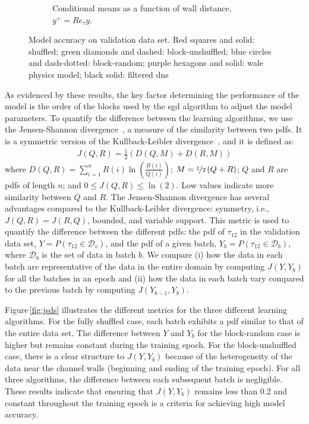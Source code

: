 \documentclass[review]{elsarticle}
\begin{document}
\begin{figure}[!tbp]
\begin{subfigure}[t]{0.48\textwidth}
    \caption{Conditional means as a function of wall distance, $y^+ = Re_\tau y$.}%
  \end{subfigure}%
  \caption{Model accuracy on validation data set. Red squares and solid: shuffled; green diamonds and dashed: block-unshuffled; blue circles and dash-dotted: block-random; purple hexagons and solid: \gls{wale} physics model; black solid: filtered \gls{dns}}\label{fig:predictions}%
\end{figure}%

As evidenced by these results, the key factor determining the
performance of the model is the order of the blocks used by the
\gls{sgd} algorithm to adjust the model
parameters. To quantify the difference between the learning
algorithms, we use the Jensen-Shannon divergence~\cite{Endres2003,
  Osterreicher2003}, a measure of the similarity between two
\glspl{pdf}. It is a symmetric version of the Kullback-Leibler
divergence~\cite{Kullback1987}, and it is defined as:
\begin{align}
  \label{eq:jsd}
  J(Q,R) = \frac{1}{2} \left( D(Q , M) + D(R , M)\right)
\end{align}
where
$D(Q,R) = \sum_{i=1}^n R(i) \ln{\left( \frac{R(i)}{Q(i)} \right)}$;
$M = \nicefrac{1}{2} \left( Q+R \right)$; $Q$ and $R$ are \glspl{pdf}
of length $n$; and $0\leq J(Q,R) \leq \ln{(2)}$. Low values indicate
more similarity between $Q$ and $R$. The Jensen-Shannon divergence has
several advantages compared to the Kullback-Leibler divergence:
symmetry, i.e., $J(Q,R) = J(R,Q)$, bounded, and variable
support. This metric is used to quantify the difference between the
different \glspl{pdf}: the \gls{pdf} of $\tau_{12}$ in the validation
data set, $Y = P(\tau_{12} \in \mathcal{D}_v)$, and the \gls{pdf} of a
given batch, $Y_b = P(\tau_{12} \in \mathcal{D}_b)$, where
$\mathcal{D}_b$ is the set of data in batch $b$. We compare (i) how
the data in each batch are representative of the data in the entire
domain by computing $J(Y, Y_b)$ for all the batches in an epoch and
(ii) how the data in each batch vary compared to the previous batch
by computing $J(Y_{b-1}, Y_b)$.

Figure\,\ref{fig:jsds} illustrates the different metrics for the three
different learning algorithms. For the fully shuffled case, each batch
exhibits a \gls{pdf} similar to that of the entire data set. The
difference between $Y$ and $Y_b$ for the block-random case is higher
but remains constant during the training epoch. For the block-unshuffled
case, there is a clear structure to $J(Y,Y_b)$ because of the
heterogeneity of the data near the channel walls (beginning and ending
of the training epoch). For all three algorithms, the difference
between each subsequent batch is negligible. These results indicate
that ensuring that $J(Y,Y_b)$ remains less than 0.2 and constant
throughout the training epoch is a criteria for achieving high model
accuracy.
\end{document}
